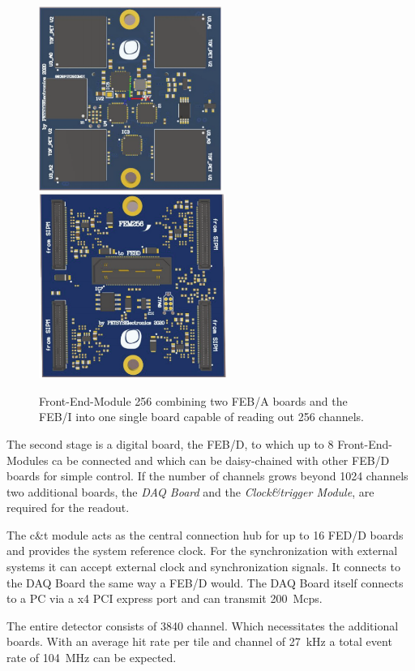 \documentclass[../BTOF_summary.tex]{subfiles}
\begin{document}
\begin{figure}[htpb]
    \centering 
    \includegraphics[height=6cm]{fig/FEM256_top.png}
    \includegraphics[height=6cm]{fig/FEM256_bottom.png}
    \caption{Front-End-Module 256 combining two FEB/A boards and the FEB/I into one single board capable of reading out 256 channels.}
    \label{fig:FEM256}
\end{figure}

The second stage is a digital board, the FEB/D, to which up to 8 Front-End-Modules ca be connected and which can be daisy-chained with other FEB/D boards for simple control.
If the number of channels grows beyond \num{1024} channels two additional boards, the \textit{DAQ Board} and the \textit{Clock\&trigger Module}, are required for the readout.

The c\&t module acts as the central connection hub for up to 16 FED/D boards and provides the system reference clock.
For the synchronization with external systems it can accept external clock and synchronization signals.
It connects to the DAQ Board the same way a FEB/D would.
The DAQ Board itself connects to a PC via a x4 PCI express port and can transmit \SI{200}{Mcps}.

The entire detector consists of \num{3840} channel.
Which necessitates the additional boards.
With an average hit rate per tile and channel of \SI{27}{kHz} a total event rate of \SI{104}{MHz} can be expected.
\end{document}
